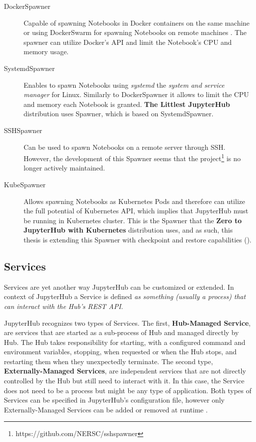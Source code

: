 \documentclass[
  digital,     %
  oneside,     %
  nosansbold,  %
  nocolorbold, %
  lof,         %
  lot,         %
]{fithesis4}
\begin{document}
\begin{description}

    \item[DockerSpawner] Capable of spawning Notebooks in Docker containers on the same machine or using DockerSwarm for spawning Notebooks on remote machines \cite{jupyterhub_spawner}. The spawner can utilize Docker's API and limit the Notebook's CPU and memory usage.
    
    \item[SystemdSpawner]
    Enables to spawn Notebooks using \emph{systemd} the \emph{system and service manager} \cite{systemd} for Linux. Similarly to DockerSpawner it allows to limit the CPU and memory each Notebook is granted. \textbf{The Littlest JupyterHub} distribution uses Spawner, which is based on SystemdSpawner.

    \item[SSHSpawner]
    Can be used to spawn Notebooks on a remote server through SSH. However, the development of this Spawner seems that the project\footnote{https://github.com/NERSC/sshspawner} is no longer actively maintained.

    \item[KubeSpawner]
    Allows spawning Notebooks as Kubernetes Pods and therefore can utilize the full potential of Kubernetes API, which implies that JupyterHub must be running in Kubernetes cluster. This is the Spawner that the \textbf{Zero to JupyterHub with Kubernetes} distribution uses, and as such, this thesis is extending this Spawner with checkpoint and restore capabilities ().
    
\end{description}


\subsection{Services}
Services are yet another way JupyterHub can be customized or extended. In context of JupyterHub a Service is defined \emph{as something (usually a process) that can interact with the Hub’s REST API}\cite{jupyterhub_service}.

JupyterHub recognizes two types of Services. The first, \textbf{Hub-Managed Service}, are services that are started as a sub-process of Hub and managed directly by Hub. The Hub takes responsibility for starting, with a configured command and environment variables, stopping, when requested or when the Hub stops, and restarting them when they unexpectedly terminate. The second type, \textbf{Externally-Managed Services}, are independent services that are not directly controlled by the Hub but still need to interact with it. In this case, the Service does not need to be a process but might be any type of application. Both types of Services can be specified in JupyterHub's configuration file, however only Externally-Managed Services can be added or removed at runtime \cite{jupyterhub_service}.
\end{document}
